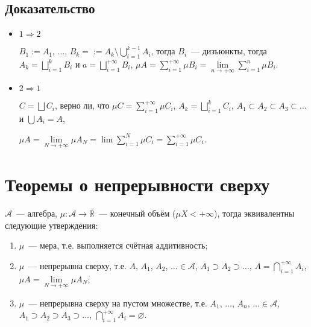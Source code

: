 \documentclass{article}
\begin{document}
        \subsection{Доказательство}
        
            \begin{itemize}
            
                \item $1 \Rightarrow 2$
                    
                    $B_1 := A_1$, $\ldots$, $B_k = := A_k \setminus \bigcup\limits^{k - 1}_{i = 1} A_i$, тогда $B_i$~--- дизъюнкты, тогда $A_k = \bigsqcup\limits^k_{i = 1} B_i$ и $a = \bigsqcup\limits^{+\infty}_{i = 1} B_i$, $\mu A = \sum\limits^{+\infty}_{i = 1} \mu B_i = \lim\limits_{n \rightarrow +\infty} \sum\limits^n_{i = 1} \mu B_i$.
                    
                \item $2 \Rightarrow 1$
                
                    $C = \bigsqcup C_i$, верно ли, что $\mu C = \sum\limits^{+\infty}_{i = 1} \mu C_i$, $A_k = \bigsqcup\limits^k_{i = 1} C_i$, $A_1 \subset A_2 \subset A_3 \subset \ldots$ и $\bigcup A_i = A$,
                    
                    $\mu A = \lim\limits_{N \rightarrow +\infty} \mu A_N = \lim \sum\limits^N_{i = 1} \mu C_i = \sum\limits^{+\infty}_{i = 1} \mu C_i$.
                    
            \end{itemize}
            
    \newpage
    
    \section{Теоремы о непрерывности сверху}
    
        $\mathcal{A}$~--- алгебра, $\mu : \mathcal{A} \rightarrow \overline{\mathbb{R}}$~--- конечный объём ($\mu X < +\infty$), тогда эквивалентны следующие утверждения:
        
        \begin{enumerate}
        
            \item $\mu$~--- мера, т.е. выполняется счётная аддитивность;
            
            \item $\mu$~--- непрерывна сверху, т.е. $A$, $A_1$, $A_2$, $\ldots \in \mathcal{A}$, $A_1 \supset A_2 \supset \ldots$, $A = \bigcap\limits^{+\infty}_{i = 1} A_i$, $\mu A = \lim\limits_{N \rightarrow +\infty} \mu A_N$;
            
            \item $\mu$~--- непрерывна сверху на пустом множестве, т.е. $A_1$, $\ldots$, $A_n$, $\ldots \in \mathcal{A}$, $A_1 \supset A_2 \supset A_3 \supset \ldots$, $\bigcap\limits^{+\infty}_{i = 1} A_i = \varnothing$.
            
        \end{enumerate}
        
\end{document}
